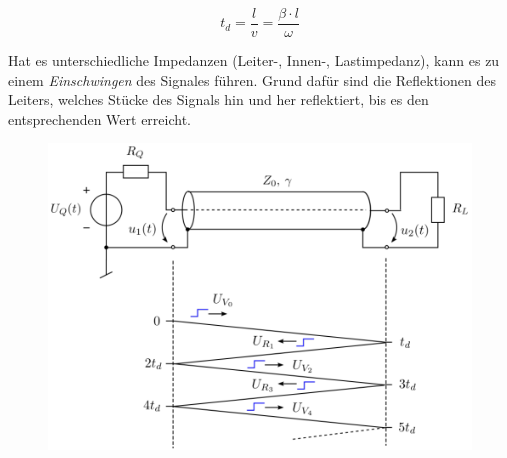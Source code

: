 \documentclass[
  10pt,
  a4paper,
  german]{article}
\numberwithin{equation}{section}
\begin{document}
\[
t_d = \frac{l}{v}=\frac{\beta\cdot l}{\omega}
\]

Hat es unterschiedliche Impedanzen (Leiter-, Innen-, Lastimpedanz), kann
es zu einem \emph{Einschwingen} des Signales führen. Grund dafür sind
die Reflektionen des Leiters, welches Stücke des Signals hin und her
reflektiert, bis es den entsprechenden Wert erreicht.

\begin{figure}[H]

{\centering \includegraphics[width=12cm,height=\textheight]{images/03_Ausgleichsvorgang.png}

}

\end{figure}
\end{document}
